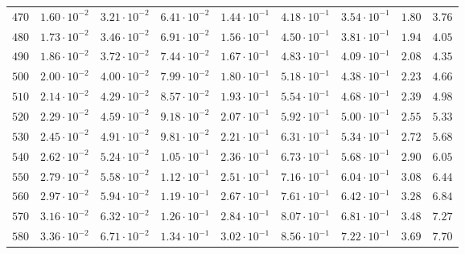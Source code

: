 \begin{landscape}
\begin{table}
\begin{tabular}{lcccccccc}
$	470	$ & $	1.60 \cdot 10^{-2} 	$ & $	3.21 \cdot 10^{-2} 	$ & $	6.41 \cdot 10^{-2} 	$ & $	1.44 \cdot 10^{-1} 	$ & $	4.18 \cdot 10^{-1} 	$ & $	3.54 \cdot 10^{-1} 	$ & $	1.80 	$ & $	3.76 	 $ \\
$	480	$ & $	1.73 \cdot 10^{-2} 	$ & $	3.46 \cdot 10^{-2} 	$ & $	6.91 \cdot 10^{-2} 	$ & $	1.56 \cdot 10^{-1} 	$ & $	4.50 \cdot 10^{-1} 	$ & $	3.81 \cdot 10^{-1} 	$ & $	1.94 	$ & $	4.05 	 $ \\
$	490	$ & $	1.86 \cdot 10^{-2} 	$ & $	3.72 \cdot 10^{-2} 	$ & $	7.44 \cdot 10^{-2} 	$ & $	1.67 \cdot 10^{-1} 	$ & $	4.83 \cdot 10^{-1} 	$ & $	4.09 \cdot 10^{-1} 	$ & $	2.08 	$ & $	4.35 	 $ \\
$	500	$ & $	2.00 \cdot 10^{-2} 	$ & $	4.00 \cdot 10^{-2} 	$ & $	7.99 \cdot 10^{-2} 	$ & $	1.80 \cdot 10^{-1} 	$ & $	5.18 \cdot 10^{-1} 	$ & $	4.38 \cdot 10^{-1} 	$ & $	2.23 	$ & $	4.66 	 $ \\
$	510	$ & $	2.14 \cdot 10^{-2} 	$ & $	4.29 \cdot 10^{-2} 	$ & $	8.57 \cdot 10^{-2} 	$ & $	1.93 \cdot 10^{-1} 	$ & $	5.54 \cdot 10^{-1} 	$ & $	4.68 \cdot 10^{-1} 	$ & $	2.39 	$ & $	4.98 	 $ \\
$	520	$ & $	2.29 \cdot 10^{-2} 	$ & $	4.59 \cdot 10^{-2} 	$ & $	9.18 \cdot 10^{-2} 	$ & $	2.07 \cdot 10^{-1} 	$ & $	5.92 \cdot 10^{-1} 	$ & $	5.00 \cdot 10^{-1} 	$ & $	2.55 	$ & $	5.33 	 $ \\
$	530	$ & $	2.45 \cdot 10^{-2} 	$ & $	4.91 \cdot 10^{-2} 	$ & $	9.81 \cdot 10^{-2} 	$ & $	2.21 \cdot 10^{-1} 	$ & $	6.31 \cdot 10^{-1} 	$ & $	5.34 \cdot 10^{-1} 	$ & $	2.72 	$ & $	5.68 	 $ \\
$	540	$ & $	2.62 \cdot 10^{-2} 	$ & $	5.24 \cdot 10^{-2} 	$ & $	1.05 \cdot 10^{-1} 	$ & $	2.36 \cdot 10^{-1} 	$ & $	6.73 \cdot 10^{-1} 	$ & $	5.68 \cdot 10^{-1} 	$ & $	2.90 	$ & $	6.05 	 $ \\
$	550	$ & $	2.79 \cdot 10^{-2} 	$ & $	5.58 \cdot 10^{-2} 	$ & $	1.12 \cdot 10^{-1} 	$ & $	2.51 \cdot 10^{-1} 	$ & $	7.16 \cdot 10^{-1} 	$ & $	6.04 \cdot 10^{-1} 	$ & $	3.08 	$ & $	6.44 	 $ \\
$	560	$ & $	2.97 \cdot 10^{-2} 	$ & $	5.94 \cdot 10^{-2} 	$ & $	1.19 \cdot 10^{-1} 	$ & $	2.67 \cdot 10^{-1} 	$ & $	7.61 \cdot 10^{-1} 	$ & $	6.42 \cdot 10^{-1} 	$ & $	3.28 	$ & $	6.84 	 $ \\
$	570	$ & $	3.16 \cdot 10^{-2} 	$ & $	6.32 \cdot 10^{-2} 	$ & $	1.26 \cdot 10^{-1} 	$ & $	2.84 \cdot 10^{-1} 	$ & $	8.07 \cdot 10^{-1} 	$ & $	6.81 \cdot 10^{-1} 	$ & $	3.48 	$ & $	7.27 	 $ \\
$	580	$ & $	3.36 \cdot 10^{-2} 	$ & $	6.71 \cdot 10^{-2} 	$ & $	1.34 \cdot 10^{-1} 	$ & $	3.02 \cdot 10^{-1} 	$ & $	8.56 \cdot 10^{-1} 	$ & $	7.22 \cdot 10^{-1} 	$ & $	3.69 	$ & $	7.70 	 $ \\

\end{tabular}
\end{table}
\end{landscape}
